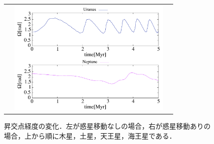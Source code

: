 \documentclass[11pt,a4paper,oneside,onecolumn]{jreport}
\begin{document}
\begin{figure}[H]
\begin{tabular}{ccc}
\begin{minipage}[t]{0.1\hsize}
\end{minipage} &
\begin{minipage}[t]{0.45\hsize}
\centering
\includegraphics[width=8cm]{./image/Move500kyr_capitalOMEGA_5Myr_URANEP.pdf}
\end{minipage}
%
\end{tabular}
\caption{昇交点経度の変化．左が惑星移動なしの場合，右が惑星移動ありの場合，上から順に木星，土星，天王星，海王星である．\label{fig:OMEGA}}
\end{figure}
\end{document}

